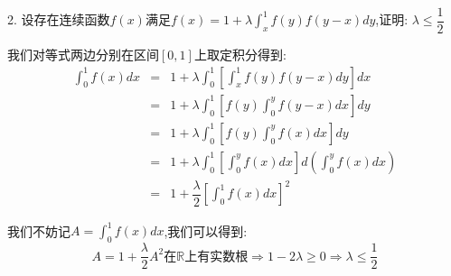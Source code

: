 2. 设存在连续函数$f(x)$满足$f(x)=1+\lambda\int_{x}^{1}f(y)f(y-x)dy$,证明: $\lambda\leq \dfrac{1}{2}$
\begin{solution}
	
	我们对等式两边分别在区间$[0,1]$上取定积分得到: 
	\begin{eqnarray*}
		\int_{0}^{1}f(x)dx&=&1+\lambda\int_{0}^{1}[\int_{x}^{1}f(y)f(y-x)dy]dx\\
		&=&1+\lambda\int_{0}^{1}[f(y)\int_{0}^{y}f(y-x)dx]dy\\
		&=&1+\lambda\int_{0}^{1}[f(y)\int_{0}^{y}f(x)dx]dy\\
		&=&1+\lambda\int_{0}^{1}[\int_{0}^{y}f(x)dx]d(\int_{0}^{y}f(x)dx)\\
		&=&1+\dfrac{\lambda}{2}[\int_{0}^{1}f(x)dx]^2
	\end{eqnarray*}
	
	我们不妨记$A=\int_{0}^{1}f(x)dx$,我们可以得到: 
	$$A=1+\dfrac{\lambda}{2}A^2\text{在}\mathbb{R}\text{上有实数根}\Rightarrow 1-2\lambda\geq 0\Rightarrow \lambda\leq \dfrac{1}{2}$$
\end{solution}